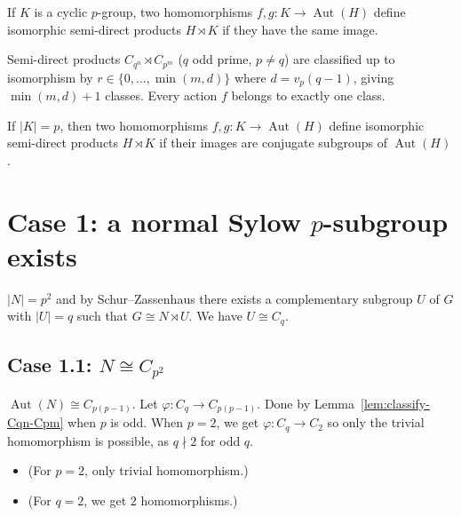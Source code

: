 \begin{lemma}
    \label{lem:same-image-sdp}
    If $K$ is a cyclic $p$-group, two homomorphisms $f, g : K \to
    \operatorname{Aut}(H)$ define isomorphic semi-direct products $H \rtimes K$
    if they have the same image.
\end{lemma}

\begin{lemma}
    \label{lem:classify-Cqn-Cpm}
    Semi-direct products $C_{q^n} \rtimes C_{p^m}$ ($q$ odd prime, $p \neq q$)
    are classified up to isomorphism by $r \in \{0, \ldots, \min(m, d)\}$
    where $d = v_p(q - 1)$, giving $\min(m, d) + 1$ classes. Every action $f$
    belongs to exactly one class.
\end{lemma}

\begin{lemma}
    \label{lem:conjugate-image-sdp}
    If $|K| = p$, then two homomorphisms $f, g : K \to \operatorname{Aut}(H)$
    define isomorphic semi-direct products $H \rtimes K$ if their images are
    conjugate subgroups of $\operatorname{Aut}(H)$.
\end{lemma}

\section{Case 1: a normal Sylow $p$-subgroup exists}

$|N| = p^2$ and by Schur--Zassenhaus there exists a complementary subgroup $U$
of $G$ with $|U| = q$ such that $G \cong N \rtimes U$. We have $U \cong C_q$.

\subsection{Case 1.1: $N \cong C_{p^2}$}

$\operatorname{Aut}(N) \cong C_{p(p-1)}$. Let
$\varphi : C_q \to C_{p(p-1)}$. Done by Lemma~\ref{lem:classify-Cqn-Cpm}
when $p$ is odd. When $p = 2$, we get $\varphi : C_q \to C_2$ so only the
trivial homomorphism is possible, as $q \nmid 2$ for odd $q$.

\begin{itemize}
    \item (For $p = 2$, only trivial homomorphism.)
    \item (For $q = 2$, we get $2$ homomorphisms.)
\end{itemize}

